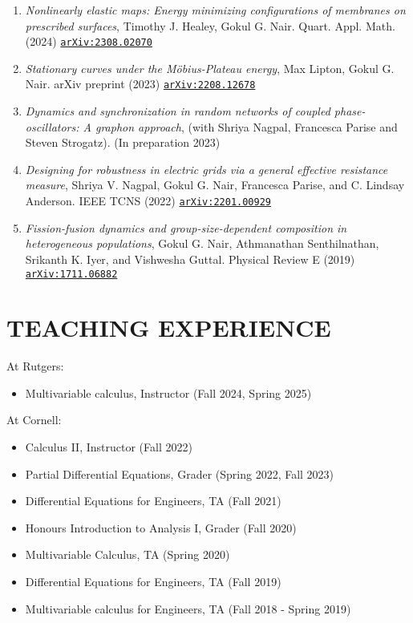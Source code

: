 \documentclass[margin]{res} %
\begin{document}
\begin{resume}
\begin{enumerate}
	\item {\sl Nonlinearly elastic maps: Energy minimizing configurations of membranes on prescribed surfaces}, Timothy J. Healey, Gokul G. Nair. Quart. Appl. Math. (2024) \href{https://arxiv.org/abs/2308.02070}{\texttt{arXiv:2308.02070}} 
	
	\item {\sl Stationary curves under the M\"obius-Plateau energy}, Max Lipton, Gokul G. Nair. arXiv preprint (2023) \href{https://arxiv.org/abs/2208.12678}{\texttt{arXiv:2208.12678}} 
	
	\item {\sl Dynamics and synchronization in random networks of coupled phase-oscillators: A graphon approach}, (with Shriya Nagpal, Francesca Parise and Steven Strogatz). (In preparation 2023)
	
	\item {\sl Designing for robustness in electric grids via a general effective resistance measure}, Shriya V. Nagpal, Gokul G. Nair, Francesca Parise, and C. Lindsay Anderson. IEEE TCNS (2022) \href{https://arxiv.org/abs/2201.00929}{\texttt{arXiv:2201.00929}}
	
	\item {\sl Fission-fusion dynamics and group-size-dependent composition in heterogeneous populations}, Gokul G. Nair, Athmanathan Senthilnathan, Srikanth K. Iyer, and Vishwesha Guttal. Physical Review E (2019) \href{https://arxiv.org/abs/1711.06882}{\texttt{arXiv:1711.06882}}
\end{enumerate}

\section{TEACHING EXPERIENCE}
At Rutgers:
\begin{itemize}
	\item Multivariable calculus, Instructor (Fall 2024, Spring 2025)
\end{itemize}

At Cornell:
\begin{itemize}
	\item Calculus II, Instructor (Fall 2022)
	\item Partial Differential Equations, Grader (Spring 2022, Fall 2023)
	\item Differential Equations for Engineers, TA (Fall 2021)
	\item Honours Introduction to Analysis I, Grader (Fall 2020)
	\item Multivariable Calculus, TA (Spring 2020)
	\item Differential Equations for Engineers, TA (Fall 2019)
	\item Multivariable calculus for Engineers, TA (Fall 2018 - Spring 2019)
\end{itemize}


\end{resume}
\end{document}
